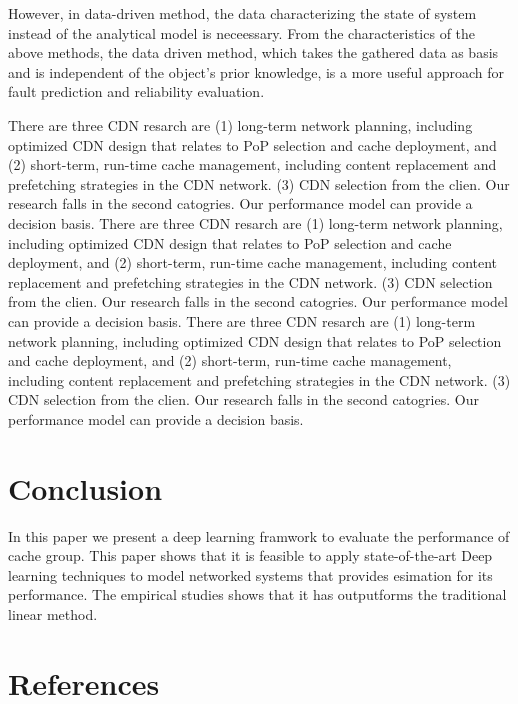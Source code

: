 \documentclass[5p]{elsarticle}
\begin{document}
However, in data-driven method, the data characterizing the state of system instead of the analytical model is neceessary. From the characteristics of the above methods, the data driven method, which takes the gathered data as basis and is independent of the object’s prior knowledge, is a more useful approach for fault prediction and reliability evaluation.

There are three CDN resarch are (1) long-term network planning, including optimized CDN design that relates to PoP selection and cache deployment, and (2) short-term, run-time cache management, including content replacement and prefetching strategies in the CDN network. (3) CDN selection from the clien. Our research falls in the second catogries. Our performance model can provide a decision basis.
There are three CDN resarch are (1) long-term network planning, including optimized CDN design that relates to PoP selection and cache deployment, and (2) short-term, run-time cache management, including content replacement and prefetching strategies in the CDN network. (3) CDN selection from the clien. Our research falls in the second catogries. Our performance model can provide a decision basis.
There are three CDN resarch are (1) long-term network planning, including optimized CDN design that relates to PoP selection and cache deployment, and (2) short-term, run-time cache management, including content replacement and prefetching strategies in the CDN network. (3) CDN selection from the clien. Our research falls in the second catogries. Our performance model can provide a decision basis.
\section{Conclusion}

In this paper we present a deep learning framwork to evaluate the performance of cache group. This paper shows that it is feasible to apply state-of-the-art Deep learning techniques to model networked systems that provides esimation for its performance. The empirical studies shows that it has outputforms the traditional linear method.

\section*{References}


\end{document}
